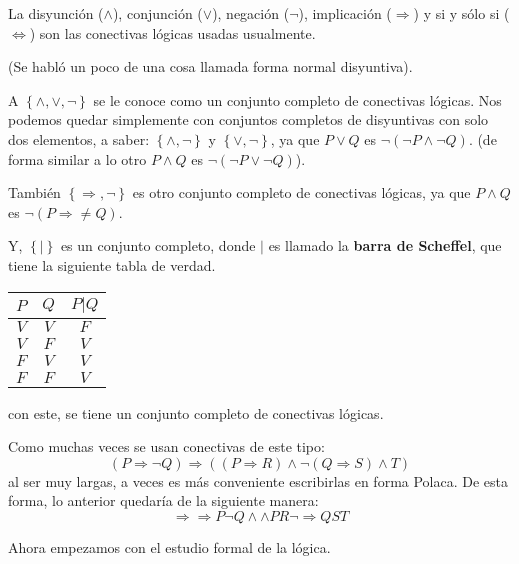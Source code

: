\documentclass[12pt]{report}
\theoremstyle{largebreak}
\begin{document}
    La disyunción ($\land$), conjunción ($\lor$), negación ($\neg$), implicación ($\Rightarrow$) y si y sólo si ($\iff$) son las conectivas lógicas usadas usualmente. 

    (Se habló un poco de una cosa llamada forma normal disyuntiva).
    
    A $\left\{\land, \lor, \neg \right\}$ se le conoce como un conjunto completo de conectivas lógicas. Nos podemos quedar simplemente con conjuntos completos de disyuntivas con solo dos elementos, a saber: $\left\{\land, \neg \right\}$ y $\left\{\lor, \neg \right\}$, ya que $P\lor Q$ es $\neg(\neg P\land \neg Q)$. (de forma similar a lo otro $P\land Q$ es $\neg(\neg P\lor \neg Q)$).

    También $\left\{\Rightarrow, \neg \right\}$ es otro conjunto completo de conectivas lógicas, ya que $P\land Q$ es $\neg(P\Rightarrow\neq Q)$.

    Y, $\left\{|\right\}$ es un conjunto completo, donde $|$ es llamado la \textbf{barra de Scheffel}, que tiene la siguiente tabla de verdad.

    \begin{center}
        \begin{tabular}{c c | c}
            \hline
            $P$ & $Q$ & $P|Q$ \\
            \hline
            $V$ & $V$ & $F$ \\
            $V$ & $F$ & $V$ \\
            $F$ & $V$ & $V$ \\
            $F$ & $F$ & $V$ \\
        \end{tabular}
    \end{center}
    con este, se tiene un conjunto completo de conectivas lógicas.

    Como muchas veces se usan conectivas de este tipo:
    \begin{equation*}
        (P\Rightarrow \neg Q)\Rightarrow((P\Rightarrow R)\land\neg(Q\Rightarrow S)\land T)
    \end{equation*}
    al ser muy largas, a veces es más conveniente escribirlas en forma Polaca. De esta forma, lo anterior quedaría de la siguiente manera:
    \begin{equation*}
        \Rightarrow\Rightarrow P\neg Q\land\land PR\neg\Rightarrow Q S T 
    \end{equation*}

    Ahora empezamos con el estudio formal de la lógica.
\end{document}

